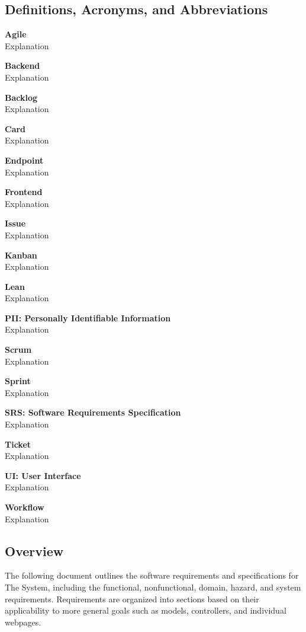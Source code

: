 \documentclass[12pt]{report}
\begin{document}
	\subsection{Definitions, Acronyms, and Abbreviations}
		\begin{reqlist}
			\item \textbf{Agile} \\ Explanation
			\item \textbf{Backend} \\ Explanation
			\item \textbf{Backlog} \\ Explanation
			\item \textbf{Card} \\ Explanation
			\item \textbf{Endpoint} \\ Explanation
			\item \textbf{Frontend} \\ Explanation
			\item \textbf{Issue} \\ Explanation
			\item \textbf{Kanban} \\ Explanation
			\item \textbf{Lean} \\ Explanation
			\item \textbf{PII: Personally Identifiable Information} \\ Explanation
			\item \textbf{Scrum} \\ Explanation
			\item \textbf{Sprint} \\ Explanation
			\item \textbf{SRS: Software Requirements Specification} \\ Explanation
			\item \textbf{Ticket} \\ Explanation
			\item \textbf{UI: User Interface} \\ Explanation
			\item \textbf{Workflow} \\ Explanation
		\end{reqlist}

	\subsection{Overview}
		The following document outlines the software requirements and specifications for The System, including the functional, nonfunctional, domain, hazard, and system requirements.
		Requirements are organized into sections based on their applicability to more general goals such as models, controllers, and individual webpages.
\end{document}
